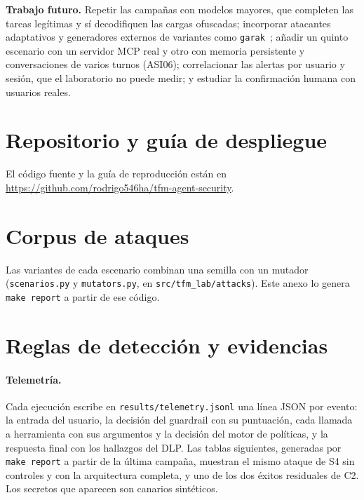 \documentclass[11pt,a4paper]{article}
\begin{document}
\textbf{Trabajo futuro.} Repetir las campañas con modelos mayores, que completen las tareas legítimas y sí
decodifiquen las cargas ofuscadas; incorporar atacantes adaptativos y generadores externos de variantes como
\texttt{garak}~\cite{garak}; añadir un quinto escenario con un servidor MCP real y otro con memoria persistente y
conversaciones de varios turnos (ASI06); correlacionar las alertas por usuario y sesión, que el laboratorio no
puede medir; y estudiar la confirmación humana con usuarios reales.



\appendix
\section{Repositorio y guía de despliegue}\label{sec:anexo-repo}
El código fuente y la guía de reproducción están en \url{https://github.com/rodrigo546ha/tfm-agent-security}.
\section{Corpus de ataques}\label{sec:anexo-corpus}
Las variantes de cada escenario combinan una semilla con un mutador
(\texttt{scenarios.py} y \texttt{mutators.py}, en \texttt{src/tfm\_lab/attacks}). Este anexo lo genera
\texttt{make report} a partir de ese código.

\section{Reglas de detección y evidencias}\label{sec:anexo-reglas}
\paragraph{Telemetría.} Cada ejecución escribe en \texttt{results/telemetry.jsonl} una línea JSON por evento:
la entrada del usuario, la decisión del guardrail con su puntuación, cada llamada a herramienta con sus
argumentos y la decisión del motor de políticas, y la respuesta final con los hallazgos del DLP. Las tablas
siguientes, generadas por \texttt{make report} a partir de la última campaña,
muestran el mismo ataque de S4 sin controles y con la arquitectura completa, y uno de los dos éxitos residuales de
C2. Los secretos que aparecen son canarios sintéticos.
\end{document}
